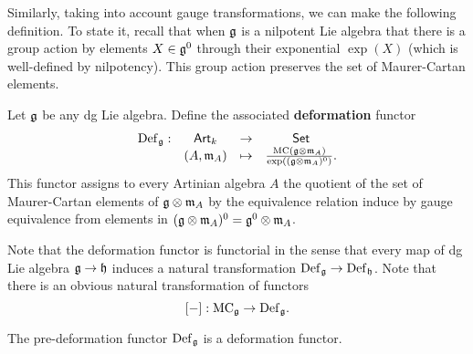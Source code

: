 \documentclass[11pt]{amsart}
\begin{document}
Similarly, taking into account gauge transformations, we can make the following definition.
To state it, recall that when $\mathfrak g$ is a nilpotent Lie algebra that there is a group action by elements $X \in \mathfrak g^0$ through their exponential $\exp(X)$ (which is well-defined by nilpotency). 
This group action preserves the set of Maurer-Cartan elements. 

\begin{dfn}
Let $\mathfrak g$ be any dg Lie algebra.
Define the associated {\bf deformation} functor
\[
\begin{array}{cccc}
{\rm Def}_\mathfrak g : & {\sf Art}_k & \to & {\sf Set} \\
& (A,{\mathfrak m}_A) & \mapsto & \frac{{\rm MC}(\mathfrak g \otimes {\mathfrak m}_A)}{\exp((\mathfrak g \otimes {\mathfrak m}_A)^0)} .
\end{array}
\]
This functor assigns to every Artinian algebra $A$ the quotient of the set of Maurer-Cartan elements of $\mathfrak g \otimes {\mathfrak m}_A$ by the equivalence relation induce by gauge equivalence from elements in $(\mathfrak g \otimes {\mathfrak m}_A)^0 = \mathfrak g^0 \otimes {\mathfrak m}_A$. 
\end{dfn}

Note that the deformation functor is functorial in the sense that every map of dg Lie algebra $\mathfrak g \to \mathfrak h$ induces a natural transformation ${\rm Def}_\mathfrak g \to {\rm Def}_\mathfrak h$. 
Note that there is an obvious natural transformation of functors
\[
[-] : {\rm MC}_\mathfrak g \to {\rm Def}_\mathfrak g .
\] 


\begin{prop}
The pre-deformation functor ${\rm Def}_\mathfrak g$ is a deformation functor.
\end{prop}
\end{document}
